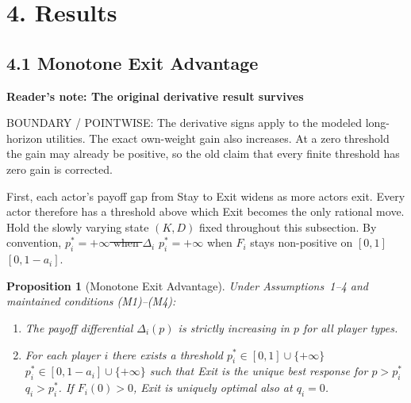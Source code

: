 \documentclass[12pt]{article}
\newtheorem{proposition}{Proposition}
\theoremstyle{definition}
\theoremstyle{remark}
\providecommand{\DIFaddtex}[1]{{\color{AddedText}#1}}
\providecommand{\DIFdeltex}[1]{{\color{DeletedText}\sout{#1}}}
\providecommand{\DIFaddbegin}{}
\providecommand{\DIFaddend}{}
\providecommand{\DIFdelbegin}{}
\providecommand{\DIFdelend}{}
\newcommand{\ReviewNote}[2]{\par\begin{mdframed}[backgroundcolor=blue!3,linecolor=NoteText,linewidth=0.6pt]\color{NoteText}\small\textbf{Reader's note: #1}\par #2\end{mdframed}\par}
\providecommand{\DIFadd}[1]{\texorpdfstring{\DIFaddtex{#1}}{#1}} %
\providecommand{\DIFdel}[1]{\texorpdfstring{\DIFdeltex{#1}}{}} %
\begin{document}

\section{4. Results}

\subsection{4.1 Monotone Exit Advantage}


\ReviewNote{The original derivative result survives}{BOUNDARY / POINTWISE: The derivative signs apply to the modeled long-horizon utilities. The exact own-weight gain also increases. At a zero threshold the gain may already be positive, so the old claim that every finite threshold has zero gain is corrected.}
First, each actor's payoff gap from Stay to Exit widens as more actors exit. Every actor therefore has a threshold above which Exit becomes the only rational move. Hold the slowly varying state $(K, D)$ fixed throughout this subsection. By convention, \DIFdelbegin \DIFdel{$p_i^* = +\infty$ when $\Delta_i$ }\DIFdelend \DIFaddbegin \DIFadd{$p_i^*=+\infty$ when $F_i$ }\DIFaddend stays non-positive on \DIFdelbegin \DIFdel{$[0, 1]$}\DIFdelend \DIFaddbegin \DIFadd{$[0,1-a_i]$}\DIFaddend .

\begin{proposition}[Monotone Exit Advantage]
Under Assumptions~1--4 and maintained conditions (M1)--(M4):

\begin{enumerate}[label=(\roman*)]
\item The payoff differential $\Delta_i(p)$ is strictly increasing
in $p$ for all player types.
\item For each player $i$ there exists a threshold
\DIFdelbegin \DIFdel{$p_i^* \in [0, 1] \cup \{+\infty\}$ }\DIFdelend \DIFaddbegin \DIFadd{$p_i^*\in[0,1-a_i]\cup\{+\infty\}$ }\DIFaddend such that Exit is the unique
best response for \DIFdelbegin \DIFdel{$p > p_i^*$}\DIFdelend \DIFaddbegin \DIFadd{$q_i>p_i^*$. If $F_i(0)>0$, Exit is uniquely optimal also at $q_i=0$}\DIFaddend .
\end{enumerate}
\end{proposition}
\end{document}
